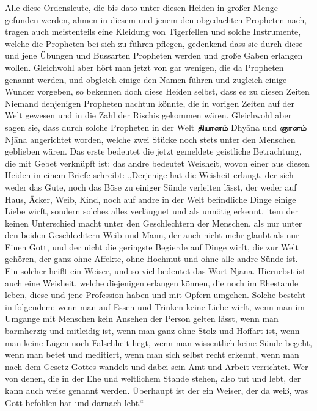 \documentclass{article}
\newcommand{\TamilText}[1]{\texttamil{#1}}
\newcommand{\tam}[1]{\TamilText{#1}}
\begin{document}
Alle diese Ordensleute, die bis dato unter diesen Heiden in großer Menge gefunden werden, ahmen in diesem und jenem den obgedachten Propheten nach, tragen auch meistenteils eine Kleidung von Tigerfellen und solche Instrumente, welche die Propheten bei sich zu führen pflegen, gedenkend dass sie durch diese und jene Übungen und Bussarten Propheten werden und große Gaben erlangen wollen. Gleichwohl aber hört man jetzt von gar wenigen, die da Propheten genannt werden, und obgleich einige den Namen führen und zugleich einige Wunder vorgeben, so bekennen doch diese Heiden selbst, dass es zu diesen Zeiten Niemand denjenigen Propheten nachtun könnte, die in vorigen Zeiten auf der Welt gewesen und in die Zahl der Rischis gekommen wären. Gleichwohl aber sagen sie, dass durch solche Propheten in der Welt \tam{தியானம்} Dhy\={a}na und \tam{ஞானம்} Nj\={a}na angerichtet worden, welche zwei Stücke noch stets unter den Menschen geblieben wären. Das erste bedeutet die jetzt gemeldete geistliche Betrachtung, die mit Gebet verknüpft ist: das andre bedeutet Weisheit, wovon einer aus diesen Heiden in einem Briefe schreibt: „Derjenige hat die Weisheit erlangt, der sich weder das Gute, noch das Böse zu einiger Sünde verleiten lässt, der weder auf Haus, Äcker, Weib, Kind, noch auf andre in der Welt befindliche Dinge einige Liebe wirft, sondern solches alles verläugnet und als unnötig erkennt, item der keinen Unterschied macht unter den Geschlechtern der Menschen, als nur unter den beiden Geschlechtern Weib und Mann, der auch nicht mehr glaubt als nur Einen Gott, und der nicht die geringste Begierde auf Dinge wirft, die zur Welt gehören, der ganz ohne Affekte, ohne Hochmut und ohne alle andre Sünde ist. Ein solcher heißt ein Weiser, und so viel bedeutet das Wort Nj\={a}na. Hiernebst ist auch eine Weisheit, welche diejenigen erlangen können, die noch im Ehestande leben, diese und jene Profession haben und mit Opfern umgehen. Solche besteht in folgendem: wenn man auf Essen und Trinken keine Liebe wirft, wenn man im Umgange mit Menschen kein Ansehen der Person gelten lässt, wenn man barmherzig und mitleidig ist, wenn man ganz ohne Stolz und Hoffart ist, wenn man keine Lügen noch Falschheit hegt, wenn man wissentlich keine Sünde begeht, wenn man betet und meditiert, wenn man sich selbst recht erkennt, wenn man nach dem Gesetz Gottes wandelt und dabei sein Amt und Arbeit verrichtet. Wer von denen, die in der Ehe und weltlichem Stande stehen, also tut und lebt, der kann auch weise genannt werden. Überhaupt ist der ein Weiser, der da weiß, was Gott befohlen hat und darnach lebt.“
\end{document}

